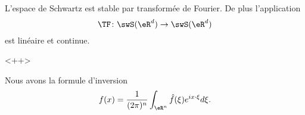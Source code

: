 \begin{proposition}
    L'espace de Schwartz est stable par transformée de Fourier. De plus l'application
    \begin{equation}
        \TF\colon \swS(\eR^d)\to \swS(\eR^d)
    \end{equation}
    est linéaire et continue.
\end{proposition}
<++>


\begin{theorem}
    Nous avons la formule d'inversion
    \begin{equation}
        f(x)=\frac{1}{ (2\pi)^n }\int_{\eR^n}\hat f(\xi) e^{ix\cdot \xi}d\xi.
    \end{equation}
\end{theorem}

